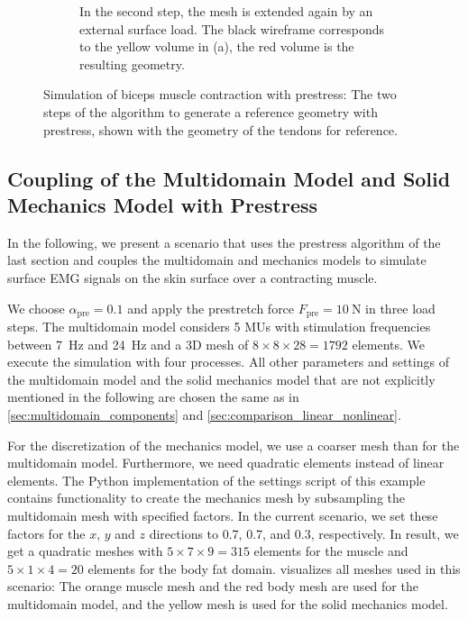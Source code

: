 \begin{figure}
\begin{subfigure}[t]{0.48\textwidth}
    \caption{In the second step, the mesh is extended again by an external surface load. The black wireframe corresponds to the yellow volume in (a), the red volume is the resulting geometry.}%
    \label{fig:neuromuscular_prestretch_2}%
  \end{subfigure}
  \hfill
  \caption{Simulation of biceps muscle contraction with prestress: The two steps of the algorithm to generate a reference geometry with prestress, shown with the geometry of the tendons for reference.}%
  \label{fig:neuromuscular_prestretch}%
\end{figure}%


\subsection{Coupling of the Multidomain Model and Solid Mechanics Model with Prestress}\label{sec:multidomain_contraction}

In the following, we present a scenario that uses the prestress algorithm of the last section and couples the multidomain and mechanics models to simulate surface EMG signals on the skin surface over a contracting muscle.

We choose $\alpha_\text{pre}=0.1$ and apply the prestretch force $F_\text{pre}=\SI{10}{\newton}$ in three load steps. The multidomain model considers 5 MUs with stimulation frequencies between \SI{7}{\hertz} and \SI{24}{\hertz} and a 3D mesh of $8 \times 8 \times 28 = 1792$ elements. We execute the simulation with four processes. All other parameters and settings of the multidomain model and the solid mechanics model that are not explicitly mentioned in the following are chosen the same as in \cref{sec:multidomain_components} and \cref{sec:comparison_linear_nonlinear}.

For the discretization of the mechanics model, we use a coarser mesh than for the multidomain model. Furthermore, we need quadratic elements instead of linear elements. The Python implementation of the settings script of this example contains functionality to create the mechanics mesh by subsampling the multidomain mesh with specified factors. In the current scenario, we set these factors for the $x$, $y$ and $z$ directions to 0.7, 0.7, and 0.3, respectively. In result, we get a quadratic meshes with $5 \times 7 \times 9 = 315$ elements for the muscle and $5 \times 1 \times 4 = 20$  elements for the body fat domain.  visualizes all meshes used in this scenario: The orange muscle mesh and the red body mesh are used for the multidomain model, and the yellow mesh is used for the solid mechanics model.


